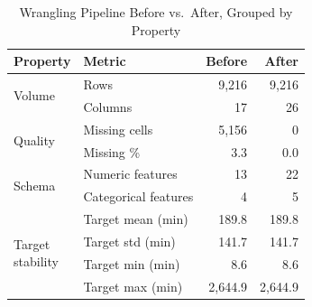 \documentclass[conference]{IEEEtran}
\begin{document}
\begin{table}[H]
\centering
\caption{Wrangling Pipeline Before vs.\ After, Grouped by Property}
\label{tab:wrangling}
\renewcommand{\arraystretch}{1.15}
\begin{tabular}{p{2.0cm}lrr}
\toprule
\textbf{Property} & \textbf{Metric} & \textbf{Before} & \textbf{After} \\
\midrule
\multirow{2}{*}{Volume}
 & Rows                 & 9{,}216 & 9{,}216 \\
 & Columns              & 17       & 26       \\
\midrule
\multirow{2}{*}{Quality}
 & Missing cells        & 5{,}156 & 0        \\
 & Missing \%           &    3.3   & 0.0       \\
\midrule
\multirow{2}{*}{Schema}
 & Numeric features     & 13       & 22       \\
 & Categorical features &  4       &  5       \\
\midrule
\multirow{4}{*}{\parbox{2.0cm}{Target\\stability}}
 & Target mean (min)    & 189.8     & 189.8    \\
 & Target std  (min)    & 141.7     & 141.7    \\
 & Target min  (min)    &   8.6     &   8.6    \\
 & Target max  (min)    & 2{,}644.9 & 2{,}644.9 \\
\bottomrule
\end{tabular}
\end{table}
\end{document}
